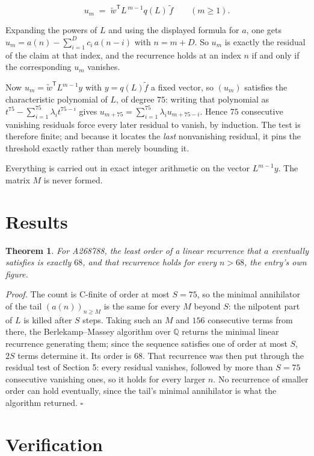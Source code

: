 \documentclass[11pt]{article}
\newtheorem{theorem}{Theorem}
\theoremstyle{definition}
\begin{document}
\[u_m \;=\; \tilde w^{\mathsf T} L^{\,m-1} q(L)\,\tilde f \qquad (m \ge 1).\]

Expanding the powers of $L$ and using the displayed formula for $a$, one gets $u_m = a(n) - \sum_{i=1}^{D} c_i\,a(n-i)$ with $n = m + D$. So $u_m$ is exactly the residual of the claim at that index, and the recurrence holds at an index $n$ if and only if the corresponding $u_m$ vanishes.

Now $u_m = \tilde w^{\mathsf T} L^{m-1} y$ with $y = q(L)\tilde f$ a fixed vector, so $(u_m)$ satisfies the characteristic polynomial of $L$, of degree $75$: writing that polynomial as $t^{75} - \sum_{i=1}^{75} \lambda_i t^{75-i}$ gives $u_{m+75} = \sum_{i=1}^{75} \lambda_i u_{m+75-i}$. Hence $75$ consecutive vanishing residuals force every later residual to vanish, by induction. The test is therefore finite; and because it locates the {\itshape last} nonvanishing residual, it pins the threshold exactly rather than merely bounding it.

Everything is carried out in exact integer arithmetic on the vector $L^{m-1}y$. The matrix $M$ is never formed.

\section{Results}

\begin{theorem} For A268788, the least order of a linear recurrence that $a$ eventually satisfies is exactly $68$, and that recurrence holds for every $n > 68$, the entry's own figure.\end{theorem}

{\itshape Proof.} The count is C-finite of order at most $S = 75$, so the minimal annihilator of the tail $(a(n))_{n \ge M}$ is the same for every $M$ beyond $S$: the nilpotent part of $L$ is killed after $S$ steps. Taking such an $M$ and $156$ consecutive terms from there, the Berlekamp--Massey algorithm over $\mathbb{Q}$ returns the minimal linear recurrence generating them; since the sequence satisfies one of order at most $S$, $2S$ terms determine it. Its order is $68$. That recurrence was then put through the residual test of Section 5: every residual vanishes, followed by more than $S = 75$ consecutive vanishing ones, so it holds for every larger $n$. No recurrence of smaller order can hold eventually, since the tail's minimal annihilator is what the algorithm returned. $\square$

\section{Verification}
\end{document}
